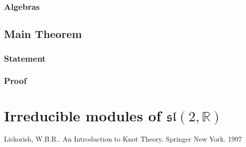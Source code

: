 \documentclass[10pt]{article} %
\theoremstyle{remark}
\begin{document}
\subsubsection{Algebras}
\subsection{Main Theorem}
\subsubsection{Statement}
\subsubsection{Proof}
\section{Irreducible modules of $\mathfrak{sl}(2,\mathbb{R})$}
\begin{thebibliography}{9}
Lickorish, W.B.R.. An Introduction to Knot Theory. Springer New York. 1997
\end{thebibliography}
\end{document}
